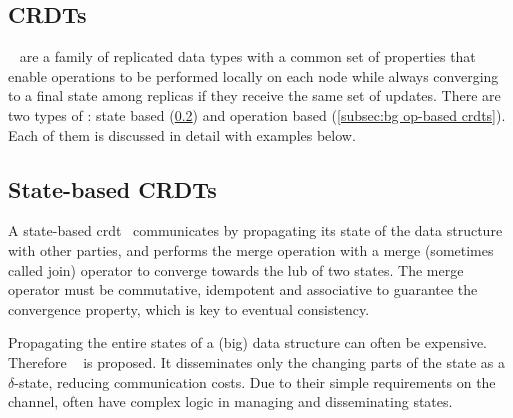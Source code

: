 \subsection{CRDTs} \label{sec:bg crdt}

~\cite{preguica2018CRDT,shapiro2011CRDT} are a family of replicated 
data types with a common set of properties 
that enable operations to be performed locally on each node while always converging
to a final state among replicas if they receive the same set of updates. 
There are two types of : state 
based (\cref{subsec:bg state-based crdt}) and operation 
based (\cref{subsec:bg op-based crdts}). 
Each of them is discussed in detail with examples below.

\subsection{State-based CRDTs}  \label{subsec:bg state-based crdt}


A state-based 
\acrshort{crdt}~\cite{vanderlinde2016delta-CRDTs,almeida2018DeltaCRDT,shapiro2011CRDT,preguica2018CRDT} communicates by propagating its state of 
the data structure with other parties, and performs the merge operation with a merge
(sometimes called join) operator to converge towards the \acrfull{lub} of
two states. The merge operator must be commutative, idempotent and
associative to guarantee the convergence property,
which is key to eventual consistency.


Propagating the entire states of a (big) data structure can often be expensive.
Therefore ~\cite{almeida2018DeltaCRDT} is proposed. It
disseminates only the changing parts of the state as 
a \(\delta\)-state, reducing communication costs.
Due to their simple requirements on the channel,  often
have complex logic in managing and disseminating states.


